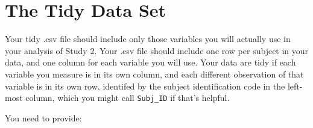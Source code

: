\documentclass[]{book}
\theoremstyle{definition}
\theoremstyle{definition}
\theoremstyle{definition}
\theoremstyle{remark}
\begin{document}
\hypertarget{the-tidy-data-set}{%
\section{The Tidy Data Set}\label{the-tidy-data-set}}

Your tidy .csv file should include only those variables you will
actually use in your analysis of Study 2. Your .csv file should include
one row per subject in your data, and one column for each variable you
will use. Your data are tidy if each variable you measure is in its own
column, and each different observation of that variable is in its own
row, identifed by the subject identification code in the left-most
column, which you might call \texttt{Subj\_ID} if that's helpful.

You need to provide:
\end{document}
